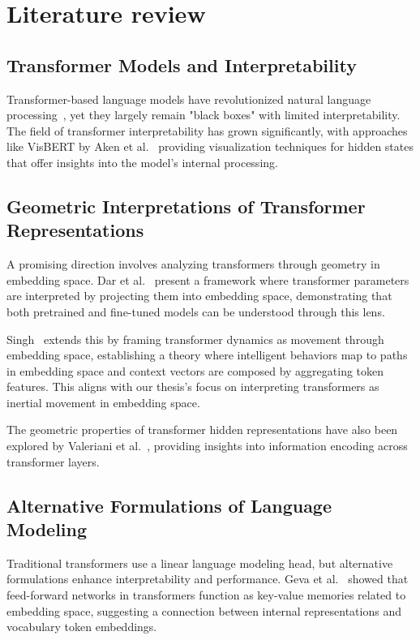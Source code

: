 \chapter{Literature review}

\section{Transformer Models and Interpretability}

Transformer-based language models have revolutionized natural language processing~\cite{vaswani2017attention}, yet they largely remain "black boxes" with limited interpretability. The field of transformer interpretability has grown significantly, with approaches like VisBERT by Aken et al.~\cite{aken2020visbert} providing visualization techniques for hidden states that offer insights into the model's internal processing.

\section{Geometric Interpretations of Transformer Representations}

A promising direction involves analyzing transformers through geometry in embedding space. Dar et al.~\cite{dar2022analyzing} present a framework where transformer parameters are interpreted by projecting them into embedding space, demonstrating that both pretrained and fine-tuned models can be understood through this lens.

Singh~\cite{singh2023analyzing} extends this by framing transformer dynamics as movement through embedding space, establishing a theory where intelligent behaviors map to paths in embedding space and context vectors are composed by aggregating token features. This aligns with our thesis's focus on interpreting transformers as inertial movement in embedding space.

The geometric properties of transformer hidden representations have also been explored by Valeriani et al.~\cite{valeriani2023geometry}, providing insights into information encoding across transformer layers.

\section{Alternative Formulations of Language Modeling}

Traditional transformers use a linear language modeling head, but alternative formulations enhance interpretability and performance. Geva et al.~\cite{geva2022transformer} showed that feed-forward networks in transformers function as key-value memories related to embedding space, suggesting a connection between internal representations and vocabulary token embeddings.

